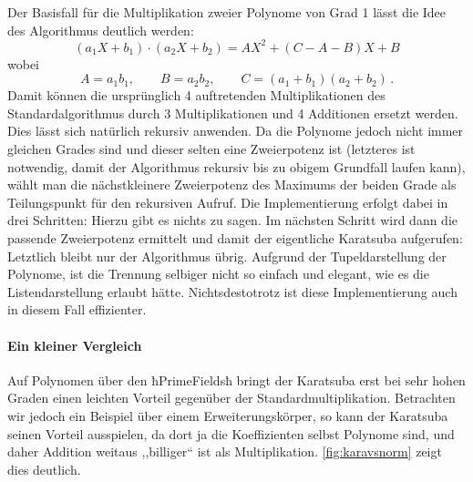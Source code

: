 Der Basisfall für die Multiplikation zweier Polynome von Grad 1 lässt die Idee
des Algorithmus deutlich werden:
\[ (a_1 X + b_1) \cdot (a_2 X + b_2) = 
  A X^2 + (C - A - B) X + B\]
wobei 
\[ A = a_1 b_1, \qquad B = a_2b_2, \qquad C = (a_1+b_1)(a_2+b_2) \,.\]
Damit können die ursprünglich 4 auftretenden Multiplikationen des
Standardalgorithmus durch 3 Multiplikationen und 4 Additionen ersetzt werden.
Dies lässt sich natürlich rekursiv anwenden. Da die Polynome jedoch nicht immer
gleichen Grades sind und dieser selten eine Zweierpotenz ist (letzteres ist
notwendig, damit der Algorithmus rekursiv bis zu obigem Grundfall laufen kann),
wählt man die nächstkleinere Zweierpotenz des Maximums der beiden Grade als
Teilungspunkt für den rekursiven Aufruf.
Die Implementierung erfolgt dabei in drei Schritten: 
Hierzu gibt es nichts zu sagen. Im nächsten Schritt wird dann die passende
Zweierpotenz ermittelt und damit der eigentliche Karatsuba aufgerufen:
Letztlich bleibt nur der Algorithmus übrig. Aufgrund der Tupeldarstellung der
Polynome, ist die Trennung selbiger nicht so einfach und elegant, wie es die
Listendarstellung erlaubt hätte. Nichtsdestotrotz ist diese Implementierung
auch in diesem Fall effizienter.

\paragraph{Ein kleiner Vergleich}
Auf Polynomen über den ħPrimeFieldsħ bringt der Karatsuba erst bei sehr hohen
Graden einen leichten Vorteil gegenüber der Standardmultiplikation. 
Betrachten wir jedoch
ein Beispiel über einem Erweiterungskörper, so kann der Karatsuba seinen Vorteil
ausspielen, da dort ja die Koeffizienten selbst Polynome sind, und daher
Addition weitaus ,,billiger`` ist als Multiplikation.
\autoref{fig:karavsnorm} zeigt dies deutlich.

